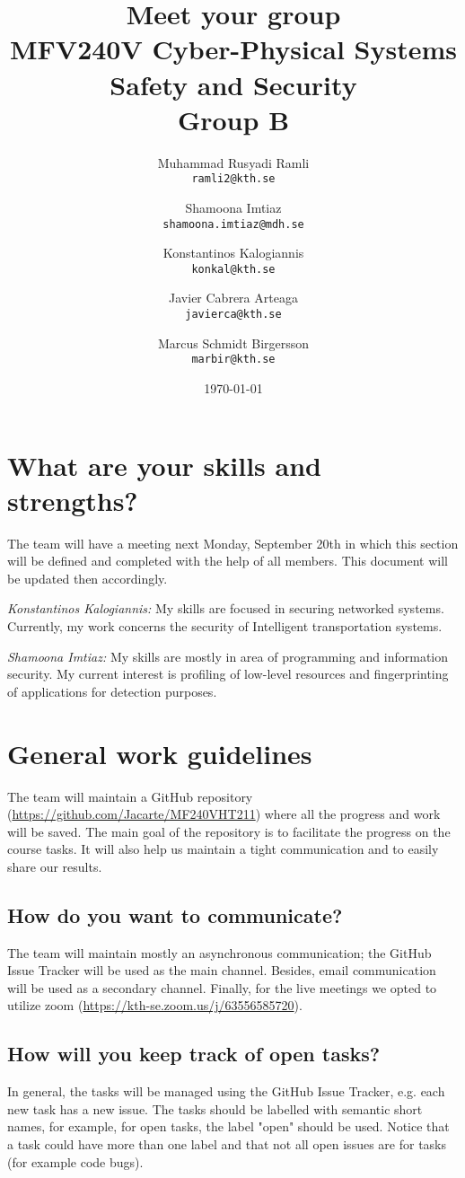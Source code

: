 \documentclass{article}
\title{Meet your group \\ \large MFV240V Cyber-Physical Systems Safety and Security \\ Group B}
\author{
  \and
  Muhammad Rusyadi Ramli\\
  \texttt{ramli2@kth.se}
  \and
  Shamoona Imtiaz\\
  \texttt{shamoona.imtiaz@mdh.se}
  \and
  Konstantinos Kalogiannis\\
  \texttt{konkal@kth.se}
  \and
  Javier Cabrera Arteaga\\
  \texttt{javierca@kth.se}
  \and
  Marcus Schmidt Birgersson\\
  \texttt{marbir@kth.se}
}
\date{\today}
\begin{document}
\maketitle


\section{What are your skills and strengths?}

The team will have a meeting next Monday, September 20th in which this section will be defined and completed with the help of all members. This document will be updated then accordingly.

\textit{Konstantinos Kalogiannis:} My skills are focused in securing networked systems. Currently, my work concerns the security of Intelligent transportation systems.

\textit {Shamoona Imtiaz:} My skills are mostly in area of programming and information security. My current interest is profiling of low-level resources and fingerprinting of applications for detection purposes.

\section{General work guidelines}

The team will maintain a GitHub repository (\url{https://github.com/Jacarte/MF240VHT211}) where all the progress and work will be saved. The main goal of the repository is to facilitate the progress on the course tasks. It will also help us maintain a tight communication and to easily share our results. 

\subsection{How do you want to communicate?}

The team will maintain mostly an asynchronous communication; the GitHub Issue Tracker will be used as the main channel. Besides, email communication will be used as a secondary channel. Finally, for the live meetings we opted to utilize zoom (\url{https://kth-se.zoom.us/j/63556585720}).

\subsection{How will you keep track of open tasks?}

In general, the tasks will be managed using the GitHub Issue Tracker, e.g. each new task has a new issue. The tasks should be labelled with semantic short names, for example, for open tasks, the label "open" should be used. Notice that a task could have more than one label and that not all open issues are for tasks (for example code bugs). 
\end{document}
